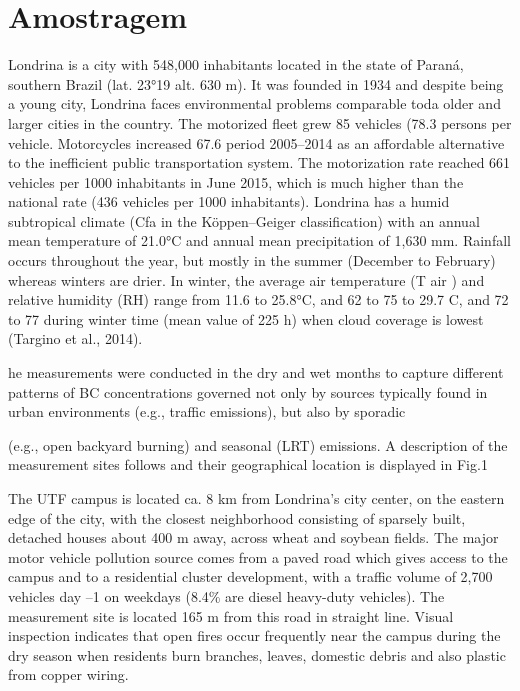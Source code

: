 \section{Amostragem}


Londrina is a city with 548,000 inhabitants located in the
state of Paraná, southern Brazil (lat. 23°19%
alt. 630 m). It was founded in 1934 and despite being a young
city, Londrina faces environmental problems comparable toda
older and larger cities in the country. The motorized fleet
grew 85%
vehicles (78.3%
persons per vehicle. Motorcycles increased 67.6%
period 2005–2014 as an affordable alternative to the
inefficient public transportation system. The motorization
rate reached 661 vehicles per 1000 inhabitants in June
2015, which is much higher than the national rate (436
vehicles per 1000 inhabitants). Londrina has a humid
subtropical climate (Cfa in the Köppen–Geiger classification)
with an annual mean temperature of 21.0°C and annual
mean precipitation of 1,630 mm. Rainfall occurs throughout
the year, but mostly in the summer (December to February)
whereas winters are drier. In winter, the average air
temperature (T air ) and relative humidity (RH) range from
11.6 to 25.8°C, and 62 to 75%
to 29.7 C, and 72 to 77%
during winter time (mean value of 225 h) when cloud
coverage is lowest (Targino et al., 2014).

he measurements were conducted in the dry and
wet months to capture different patterns of BC concentrations
governed not only by sources typically found in urban
environments (e.g., traffic emissions), but also by sporadic

(e.g., open backyard burning) and seasonal (LRT) emissions.
A description of the measurement sites follows and their
geographical location is displayed in Fig.1

The UTF campus is located ca. 8 km from Londrina’s
city center, on the eastern edge of the city, with the closest
neighborhood consisting of sparsely built, detached houses
about 400 m away, across wheat and soybean fields. The
major motor vehicle pollution source comes from a paved
road which gives access to the campus and to a residential
cluster development, with a traffic volume of 2,700
vehicles day –1 on weekdays (8.4\% are diesel heavy-duty
vehicles). The measurement site is located 165 m from this
road in straight line. Visual inspection indicates that open
fires occur frequently near the campus during the dry season
when residents burn branches, leaves, domestic debris and
also plastic from copper wiring.

